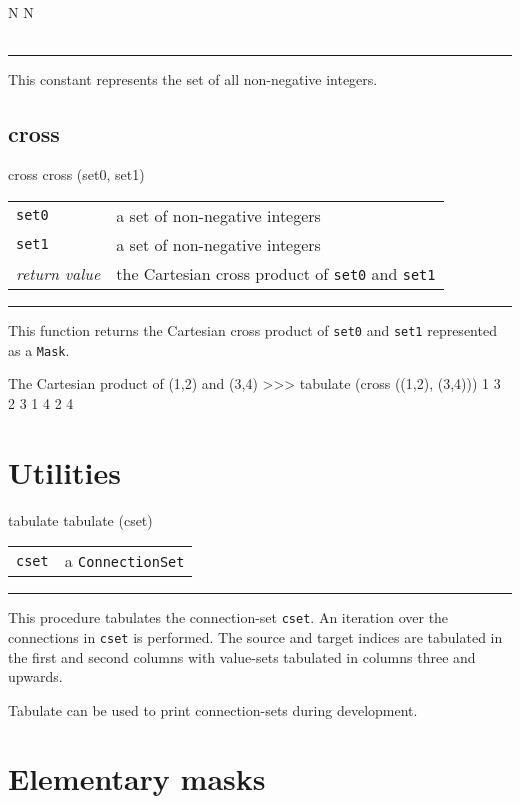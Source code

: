 \documentclass[a4paper,twoside]{report}
\makeatletter
\newenvironment{parameters}%
{\begin{tabular}{@{\hspace{2em}}lp{0.6\textwidth}}}%
{\end{tabular}\par\vspace{1mm}\par\hrule\par\vspace{5mm}}
\newcommand{\cls}[1]{\lstinline|#1|}
\newcommand{\fa}[1]{\lstinline|#1|}
\makeatother
\begin{document}
\begin{head}{N}
  N
\end{head}
\begin{parameters}
\end{parameters}
This constant represents the set of all non-negative integers.

\subsection{cross}

\begin{head}{cross}
  cross (set0, set1)
\end{head}
\begin{parameters}
  \lstinline|set0| &%
  a set of non-negative integers\\
  \lstinline|set1| &%
  a set of non-negative integers\\
  \emph{return value} &%
  the Cartesian cross product of \fa{set0} and \fa{set1}\\
\end{parameters}
This function returns the Cartesian cross product of \fa{set0} and
\fa{set1} represented as a \cls{Mask}.

\begin{code}{The Cartesian product of (1,2) and (3,4)}
>>> tabulate (cross ((1,2), (3,4)))
1 	3
2 	3
1 	4
2 	4
\end{code}

\section{Utilities}

\begin{head}{tabulate}
  tabulate (cset)
\end{head}
\begin{parameters}
  \lstinline|cset| &%
  a \cls{ConnectionSet}\\
\end{parameters}
This procedure tabulates the connection-set \fa{cset}.  An iteration
over the connections in \fa{cset} is performed.  The source and target
indices are tabulated in the first and second columns with value-sets
tabulated in columns three and upwards.

Tabulate can be used to print connection-sets during development.

\section{Elementary masks}
\end{document}
